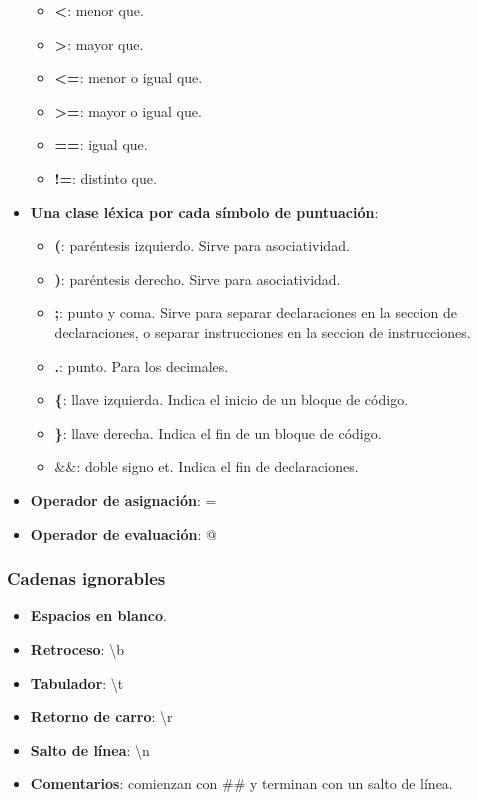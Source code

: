\documentclass[11pt]{article}
\begin{document}
\begin{itemize}
                \begin{itemize}
                    \item \textbf{\textless}: menor que.
                    \item \textbf{\textgreater}: mayor que.
                    \item \textbf{\textless=}: menor o igual que.
                    \item \textbf{\textgreater=}: mayor o igual que.
                    \item \textbf{==}: igual que.
                    \item \textbf{!=}: distinto que.
                \end{itemize}
            \item \textbf{Una clase léxica por cada símbolo de puntuación}:
                \begin{itemize}
                    \item \textbf{(}: paréntesis izquierdo. Sirve para asociatividad.
                    \item \textbf{)}: paréntesis derecho. Sirve para asociatividad.
                    \item \textbf{;}: punto y coma. Sirve para separar declaraciones en la seccion de declaraciones, o separar instrucciones en la seccion de instrucciones. 
                    \item \textbf{.}: punto. Para los decimales.
                    \item \textbf{\{}: llave izquierda. Indica el inicio de un bloque de código.
                    \item \textbf{\}}: llave derecha. Indica el fin de un bloque de código.
                    \item \textbf{$\&\&$}: doble signo et. Indica el fin de declaraciones.
                \end{itemize}
            \item \textbf{Operador de asignación}: =
            \item \textbf{Operador de evaluación}: @
        \end{itemize}
        \subsubsection*{Cadenas ignorables}
        \begin{itemize}
            \item \textbf{Espacios en blanco}.
            \item \textbf{Retroceso}: \textbackslash b
            \item \textbf{Tabulador}: \textbackslash t
            \item \textbf{Retorno de carro}: \textbackslash r
            \item \textbf{Salto de línea}: \textbackslash n
            \item \textbf{Comentarios}: comienzan con \#\# y terminan con un salto de línea.
        \end{itemize}
\end{document}
